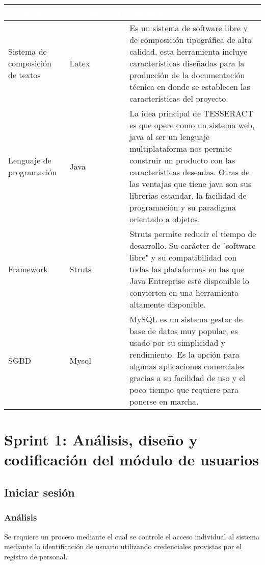 \begin{table}[H]
	\centering
	\begin{tabular}{|p{3cm}|p{3cm}|p{6cm}|}
		\hline
		\rowcolor{black} \textcolor{white} {\textbf{Elemento}} & \textcolor{white}{\textbf{Herramienta}} & \textcolor{white}{\textbf{Justificación}}  \\ \hline
		Sistema de composición de textos & Latex & Es un sistema de software libre y de composición tipográfica de alta calidad, esta herramienta incluye características diseñadas para la producción de la documentación técnica en donde se establecen las características del proyecto. \\
		\hline
		Lenguaje de programación & Java & La idea principal de TESSERACT es que opere como un sistema web, java al ser un lenguaje multiplataforma nos permite construir un producto con las características deseadas. Otras de las ventajas que tiene java son sus librerias estandar, la facilidad de programación y su paradigma orientado a objetos. \\
		\hline
		Framework & Struts & Struts permite reducir el tiempo de desarrollo. Su carácter de "software libre" y su compatibilidad con todas las plataformas en las que Java Entreprise esté disponible lo convierten en una herramienta altamente disponible. \\
		\hline
		SGBD & Mysql & MySQL es un sistema gestor de base de datos muy popular, es usado por su simplicidad y rendimiento. Es la opción para algunas aplicaciones comerciales gracias a su facilidad de uso y el poco tiempo que requiere para ponerse en marcha.  \\
		\hline
	\end{tabular}
\end{table}
\newpage

\section{Sprint 1: Análisis, diseño y codificación del módulo de usuarios}

\subsection{Iniciar sesión}
\subsubsection {Análisis}
Se requiere un proceso mediante el cual se controle el acceso individual al sistema mediante la identificación de usuario utilizando credenciales provistas por el registro de personal.\\

